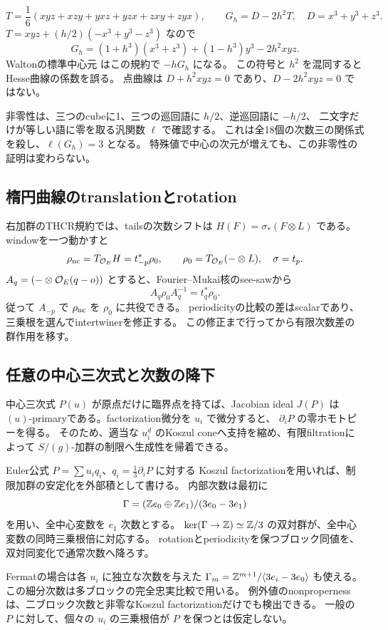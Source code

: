 \[
 T=\frac16(xyz+xzy+yxz+yzx+zxy+zyx),\qquad G_h=D-2h^2T,
 \quad D=x^3+y^3+z^3.
\]
\(T=xyz+(h/2)(-x^3+y^3-z^3)\) なので
\[
 G_h=(1+h^3)(x^3+z^3)+(1-h^3)y^3-2h^2xyz.
\]
Waltonの標準中心元 \cite[Equation (2.16)]{Walton} はこの規約で \(-hG_h\) になる。
この符号と \(h^2\) を混同するとHesse曲線の係数を誤る。
点曲線は \(D+h^2xyz=0\) であり、\(D-2h^2xyz=0\) ではない。

非零性は、三つのcubeに1、三つの巡回語に \(h/2\)、逆巡回語に \(-h/2\)、
二文字だけが等しい語に零を取る汎関数 \(\ell\) で確認する。
これは全18個の次数三の関係式を殺し、\(\ell(G_h)=3\) となる。
特殊値で中心の次元が増えても、この非零性の証明は変わらない。

\subsection{楕円曲線のtranslationとrotation}

右加群のTHCR規約では、tailsの次数シフトは
\(H(F)=\sigma_*(F\otimes L)\) である。
windowを一つ動かすと
\[
 \rho_{\rm nc}=T_{\mathcal O_E}H=t_{-p}^*\rho_0,
 \qquad \rho_0=T_{\mathcal O_E}(-\otimes L),\quad\sigma=t_p.
\]
\(A_q=(-\otimes\mathcal O_E(q-o))\) とすると、Fourier--Mukai核のsee-sawから
\[
 A_q\rho_0A_q^{-1}=t_q^*\rho_0.
\]
従って \(A_{-p}\) で \(\rho_{\rm nc}\) を \(\rho_0\) に共役できる。
periodicityの比較の差はscalarであり、三乗根を選んでintertwinerを修正する。
この修正まで行ってから有限次数差の群作用を移す。

\subsection{任意の中心三次式と次数の降下}

中心三次式 \(P(u)\) が原点だけに臨界点を持てば、Jacobian ideal \(J(P)\) は
\((u)\)-primaryである。factorization微分を \(u_i\) で微分すると、
\(\partial_iP\) の零ホモトピーを得る。
そのため、適当な \(u_i^d\) のKoszul coneへ支持を縮め、有限filtrationによって
\(S/(g)\)-加群の制限へ生成性を帰着できる。

Euler公式 \(P=\sum u_iq_i\)、\(q_i=\frac13\partial_iP\) に対する
Koszul factorizationを用いれば、制限加群の安定化を外部積として書ける。
内部次数は最初に
\[
 \Gamma=(\mathbb Z e_0\oplus\mathbb Z e_1)/(3e_0-3e_1)
\]
を用い、全中心変数を \(e_1\) 次数とする。
\(\ker(\Gamma\to\mathbb Z)\simeq\mathbb Z/3\) の双対群が、全中心変数の同時三乗根倍に対応する。
rotationとperiodicityを保つブロック同値を、双対同変化で通常次数へ降ろす。

Fermatの場合は各 \(u_i\) に独立な次数を与えた
\(\Gamma_m=\mathbb Z^{m+1}/\langle3e_i-3e_0\rangle\) も使える。
この細分次数は多ブロックの完全忠実比較で用いる。
例外値のnonpropernessは、二ブロック次数と非零なKoszul factorizationだけでも検出できる。
一般の \(P\) に対して、個々の \(u_i\) の三乗根倍が \(P\) を保つとは仮定しない。

